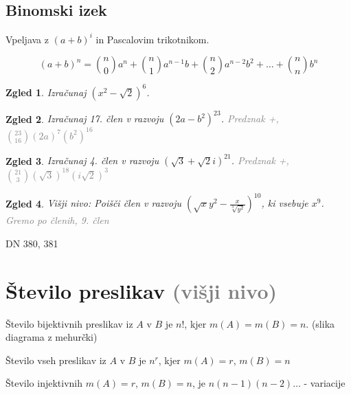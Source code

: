 \documentclass{article}
\newtheorem*{zgled}{Zgled}
\begin{document}
\subsection{Binomski izek}

Vpeljava z $(a+b)^i$ in Pascalovim trikotnikom.


\[\left(a+b\right)^n = \binom{n}{0}a^n +\binom{n}{1}a^{n-1}b + \binom{n}{2}a^{n-2}b^2+\ldots + \binom{n}{n}b^n\]

\begin{zgled}
    Izračunaj $(x^2-\sqrt{2})^6$.
\end{zgled}

\begin{zgled}
    Izračunaj 17. člen v razvoju $(2a-b^2)^{23}$. \textcolor{gray}{Predznak +, $\binom{23}{16}(2a)^7(b^2)^{16}$}
\end{zgled}

\begin{zgled}
    Izračunaj 4. člen v razvoju $(\sqrt{3}+\sqrt{2}i)^{21}$. \textcolor{gray}{Predznak +, $\binom{21}{3}(\sqrt{3})^{18}(i\sqrt{2})^{3}$}
\end{zgled}

\begin{zgled}
    Višji nivo: Poišči člen v razvoju $(\sqrt{x}y^2-\frac{x}{\sqrt[3]{y^2}})^{10}$, ki vsebuje $x^9$. \textcolor{gray}{Gremo po členih, 9. člen}
\end{zgled}

DN 380, 381

\section*{Število preslikav \textcolor{gray}{(višji nivo)}}

Število bijektivnih preslikav iz $A$ v $B$ je $n!$, kjer $m(A)=m(B)=n$. (slika diagrama z mehurčki)

Število vseh preslikav iz $A$ v $B$ je $n^r$, kjer $m(A)=r$, $m(B)=n$

Število injektivnih $m(A)=r$, $m(B)=n$, je $n(n-1)(n-2)\ldots $ - variacije
\end{document}
